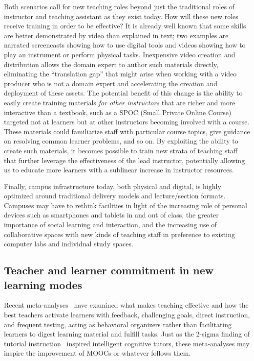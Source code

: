 Both scenarios call for new teaching roles beyond just the traditional
roles of instructor and teaching assistant as they exist today.
How will these new roles receive training in order to be effective?
It is already well known that some skills are better demonstrated by
video than explained in text; two examples are narrated screencasts
showing how to use digital tools and videos showing how to play an
instrument or perform physical tasks.
Inexpensive video creation and distribution allows the domain expert to
author such materials directly, eliminating the ``translation gap'' that
might arise when working with a video producer who is not a domain
expert and  accelerating the creation and deployment of these
assets.
The potential benefit of this change is the ability to easily create
training materials \emph{for other instructors} that are richer and more
interactive than a textbook, such as a
SPOC (Small Private Online Course) targeted not at learners but at other
instructors becoming involved with a course.
These materials could familiarize staff with particular course topics,
give guidance on resolving common learner problems, and so on.
By exploiting the ability to create such materials, it becomes possible
to train new strata of teaching staff that further leverage the
effectiveness of the lead instructor, potentially allowing us to educate
more learners with a sublinear increase in instructor resources.

Finally, campus infrastructure today, both physical and digital, is
highly optimized around traditional delivery models and lecture/section
formats. 
Campuses may have to rethink facilities in light of the increasing role
of personal devices such as 
smartphones and tablets in and out of class, the greater importance of social learning and
interaction, and the increasing use of collaborative spaces with new
kinds of teaching staff in
preference to existing computer labs and individual study spaces.

\subsection{Teacher and learner commitment in new learning modes}

Recent meta-analyses~\cite{hattie2009} have examined what makes teaching
effective and how the best teachers activate learners with feedback,
challenging goals, direct instruction, and frequent testing, acting as
behavioral organizers rather than facilitating learners to digest
learning material and fulfill tasks.
Just as the 2-sigma finding of tutorial instruction~\cite{twosigma} inspired
intelligent cognitive tutors, these meta-analyses may inspire the
improvement of MOOCs or
whatever follows them.


